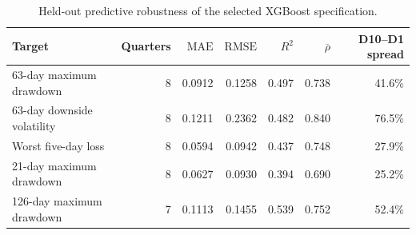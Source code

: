 \begin{table}[!htbp]
\centering
\footnotesize
\caption{Held-out predictive robustness of the selected XGBoost specification.}
\label{tab:predictive-robustness}
\begin{tabular}{lrrrrrr}
\toprule
Target & Quarters & $\mathrm{MAE}$ & $\mathrm{RMSE}$ & $R^2$ & $\overline{\rho}$ & D10--D1 spread \\
\midrule
63-day maximum drawdown & 8 & 0.0912 & 0.1258 & 0.497 & 0.738 & 41.6\% \\
63-day downside volatility & 8 & 0.1211 & 0.2362 & 0.482 & 0.840 & 76.5\% \\
Worst five-day loss & 8 & 0.0594 & 0.0942 & 0.437 & 0.748 & 27.9\% \\
21-day maximum drawdown & 8 & 0.0627 & 0.0930 & 0.394 & 0.690 & 25.2\% \\
126-day maximum drawdown & 7 & 0.1113 & 0.1455 & 0.539 & 0.752 & 52.4\% \\
\bottomrule
\end{tabular}
\end{table}
